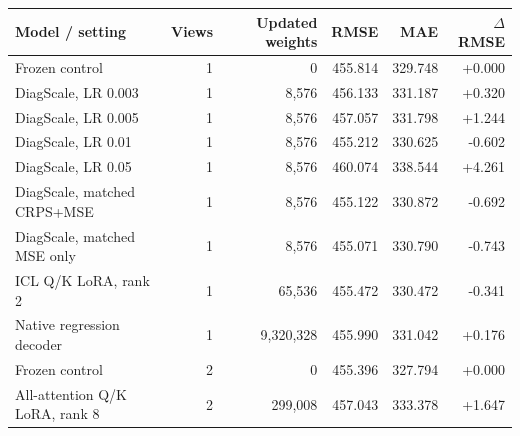 \begin{tabular}{lrrrrr}
\toprule
Model / setting & Views & Updated weights & RMSE & MAE & $\Delta$RMSE \\
\midrule
Frozen control & 1 & 0 & 455.814 & 329.748 & +0.000 \\
DiagScale, LR 0.003 & 1 & 8,576 & 456.133 & 331.187 & +0.320 \\
DiagScale, LR 0.005 & 1 & 8,576 & 457.057 & 331.798 & +1.244 \\
DiagScale, LR 0.01 & 1 & 8,576 & 455.212 & 330.625 & -0.602 \\
DiagScale, LR 0.05 & 1 & 8,576 & 460.074 & 338.544 & +4.261 \\
DiagScale, matched CRPS+MSE & 1 & 8,576 & 455.122 & 330.872 & -0.692 \\
DiagScale, matched MSE only & 1 & 8,576 & 455.071 & 330.790 & -0.743 \\
ICL Q/K LoRA, rank 2 & 1 & 65,536 & 455.472 & 330.472 & -0.341 \\
Native regression decoder & 1 & 9,320,328 & 455.990 & 331.042 & +0.176 \\
Frozen control & 2 & 0 & 455.396 & 327.794 & +0.000 \\
All-attention Q/K LoRA, rank 8 & 2 & 299,008 & 457.043 & 333.378 & +1.647 \\
\bottomrule
\end{tabular}
